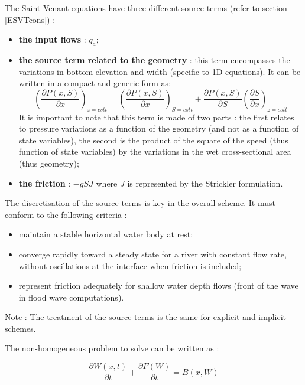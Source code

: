The Saint-Venant equations have three different source terms (refer to section \ref{ESVTcons}) :
\begin{itemize}
 \item \textbf{the input flows} : $q_a$;
 \item \textbf{the source term related to the geometry} : this term encompasses the variations in bottom elevation and width (specific to 1D equations). It can be written in a compact and generic form as:
   \begin{equation}
     \label{Decomp}
     \left ( \frac{\partial P(x,S)}{\partial x} \right )_{z=cstt} = \left ( \frac{\partial P(x,S)}{\partial x} \right )_{S=cstt} +  \frac{\partial P(x,S)}{\partial S}\left ( \frac{\partial S}{\partial x}\right )_{z=cstt}
   \end{equation}
   It is important to note that this term is made of two parts : the first relates to pressure variations as a function of the geometry (and not as a function of state variables), the second is the product of the square of the speed (thus function of state variables) by the variations in the wet cross-sectional area (thus geometry);
 \item \textbf{the friction} : $-g S J$ where $J$ is represented by the Strickler formulation.
\end{itemize}

The discretisation of the source terms is key in the overall scheme. It must conform to the following criteria :
\begin{itemize}
 \item maintain a stable horizontal water body at rest;
 \item converge rapidly toward a steady state for a river with constant flow rate, without oscillations at the interface when friction is included;
 \item represent friction adequately for shallow water depth flows (front of the wave in flood wave computations).
\end{itemize}

\begin{CommentBlock}{Note :}
The treatment of the source terms is the same for explicit and implicit schemes.
\end{CommentBlock}

The non-homogeneous problem to solve can be written as :

\begin{equation}
 \frac{\partial W(x,t)}{\partial t} + \frac{\partial F(W)}{\partial t} = B(x,W)
\end{equation}


